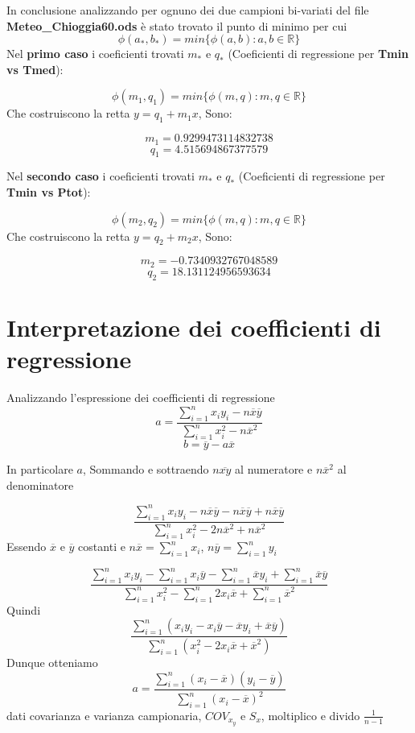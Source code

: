 \documentclass{article}
\begin{document}
\newpage

In conclusione analizzando per ognuno dei due campioni bi-variati del file \textbf{Meteo\_Chioggia60.ods}  è stato trovato il punto di minimo per cui 
\[
    \phi (a_*,b_*)=min\{\phi(a,b):a,b\in\mathbb{R}\}
\]
\newline
Nel \textbf{primo caso} i coeficienti trovati $m_*$ e $q_*$ (Coeficienti di regressione per\textbf{ Tmin vs Tmed}): 

\[
    \phi (m_1,q_1)=min\{\phi(m,q):m,q\in\mathbb{R}\}
\]
Che costruiscono la retta $y = q_1 + m_1 x$, Sono:

\[
    m_1 =  0.9299473114832738
\]
\[
    q_1 =  4.515694867377579
\]

Nel \textbf{secondo caso} i coeficienti trovati $m_*$ e $q_*$ (Coeficienti di regressione per\textbf{ Tmin vs Ptot}): 

\[
    \phi (m_2,q_2)=min\{\phi(m,q):m,q\in\mathbb{R}\}
\]
Che costruiscono la retta $y = q_2 + m_2 x$, Sono:

\[
    m_2 =  -0.7340932767048589 
\]
\[
    q_2 =  18.131124956593634
\]

\section{Interpretazione dei coefficienti di regressione}

Analizzando l'espressione dei coefficienti di regressione
\[
    a = \frac{\sum_{i=1}^{n}x_i y_i -n\overline{x}\overline{y}}{\sum_{i=1}^{n}x_i ^2 -n\overline{x}^2}
\]
\[
    b = \overline{y}-a\overline{x}
\]

In particolare $a$, Sommando e sottraendo $n\overline{xy}$ al numeratore e $n\overline{x}^2$ al denominatore

\[
    \frac{\sum_{i=1}^{n}x_i y_i -n\overline{x}\overline{y}-n\overline{x}\overline{y}+n\overline{x}\overline{y}}{\sum_{i=1}^{n}x_i ^2 -2n\overline{x}^2+n\overline{x}^2}
\]
Essendo $\overline{x}$ e $\overline{y}$ costanti e $n\overline{x}=\sum_{i=1}^{n}x_i$, $n\overline{y}=\sum_{i=1}^{n}y_i$

\[
    \frac{\sum_{i=1}^{n}x_i y_i -\sum_{i=1}^{n}x_i\overline{y}-\sum_{i=1}^{n}\overline{x}y_i+\sum_{i=1}^{n}\overline{x}\overline{y}}{\sum_{i=1}^{n}x_i ^2 -\sum_{i=1}^{n}2x_i\overline{x}+\sum_{i=1}^{n}\overline{x}^2}
\]
Quindi
\[
    \frac{\sum_{i=1}^{n}(x_i y_i -x_i\overline{y}-\overline{x}y_i+\overline{x}\overline{y})}{\sum_{i=1}^{n}(x_i ^2 -2x_i\overline{x}+\overline{x}^2)}
\]
Dunque otteniamo
\[
    a=\frac{\sum_{i=1}^{n}(x_i - \overline{x})(y_i - \overline{y})}{\sum_{i=1}^{n}(x_i - \overline{x})^2}
\]
dati covarianza e varianza campionaria, $COV_x_y$ e $S_x$, moltiplico e divido $\frac{1}{n-1}$
\end{document}
